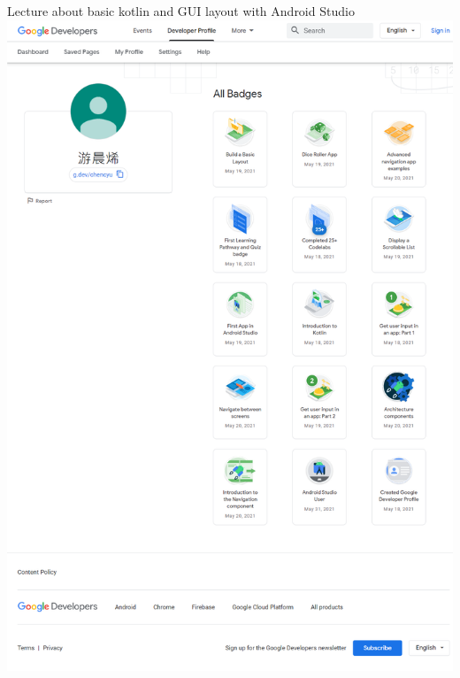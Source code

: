 

\begin{cventries}

  \cventry
    {Lecture about basic kotlin and GUI layout with Android Studio\linebreak[1]\includegraphics[scale=0.2, left]{android.png}}
    {\href{https://g.dev/chencyu}{\color{hyperlink}{Android Study Jam 2021(link)}}}
    {}{}{}


\end{cventries}

